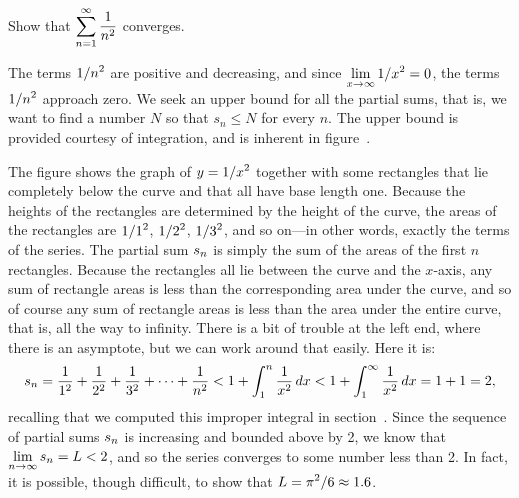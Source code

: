 \begin{example} Show that $\displaystyle\sum_{n=1}^\infty {1\over n^2}$ converges.
\par\nobreak\ssk\noindent
The terms $\displaystyle 1/n^2$ are  positive and decreasing, and since 
$\displaystyle\lim_{x\to\infty} 1/x^2=0$, the terms $\displaystyle 1/n^2$ approach zero. We
seek an upper bound for all the partial sums, that is, we want to find
a number $N$ so that $s_n\le N$ for every $n$. The upper bound is
provided courtesy of integration, and is inherent in
figure~.


The figure shows the graph of $\displaystyle y=1/x^2$ together with some rectangles
that lie completely below the curve and that all have base length
one. Because the heights of the rectangles are determined by the
height of the curve, the areas of the rectangles are $\displaystyle 1/1^2$, $\displaystyle 1/2^2$,
$\displaystyle 1/3^2$, and so on---in other words, exactly the terms of the
series. The partial sum $\displaystyle s_n$ is simply the sum of the areas of the
first $n$ rectangles. Because the rectangles all lie between the curve
and the $x$-axis, any sum of rectangle areas is less than the
corresponding area under the curve, and so of course any sum of
rectangle areas is less than the area under the entire curve, that is,
all the way to infinity.
There is a bit of trouble at the
left end, where there is an asymptote, but we can work around that
easily. Here it is:
$$
  s_n={1\over 1^2}+{1\over 2^2}+{1\over 3^2}+\cdots+{1\over n^2}
  < 1 + \int_1^n {1\over x^2}\,dx < 1+\int_1^\infty {1\over x^2}\,dx 
  =1+1=2,
$$
recalling that we computed this improper integral in 
section~. Since the sequence of partial
sums $\displaystyle s_n$ is increasing and bounded above by 2, we know that 
$\displaystyle\lim_{n\to\infty}s_n=L<2$, and so the series converges to some
number less than 2. In fact, it is possible, though difficult, to show
that $\displaystyle L=\pi^2/6\approx 1.6$.
\end{example}

